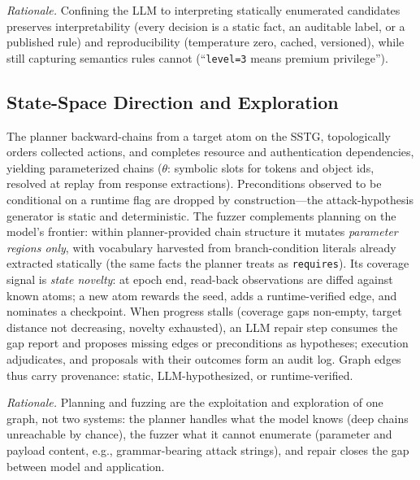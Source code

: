 \documentclass[letterpaper,twocolumn,10pt]{article}
\begin{document}
\emph{Rationale.} Confining the LLM to interpreting statically enumerated candidates preserves interpretability (every decision is a static fact, an auditable label, or a published rule) and reproducibility (temperature zero, cached, versioned), while still capturing semantics rules cannot (``\texttt{level=3} means premium privilege'').

\subsection{State-Space Direction and Exploration}
\label{sec:navigate}
The planner backward-chains from a target atom on the SSTG, topologically orders collected actions, and completes resource and authentication dependencies, yielding parameterized chains ($\theta$: symbolic slots for tokens and object ids, resolved at replay from response extractions). Preconditions observed to be conditional on a runtime flag are dropped by construction---the attack-hypothesis generator is static and deterministic. The fuzzer complements planning on the model's frontier: within planner-provided chain structure it mutates \emph{parameter regions only}, with vocabulary harvested from branch-condition literals already extracted statically (the same facts the planner treats as \texttt{requires}). Its coverage signal is \emph{state novelty}: at epoch end, read-back observations are diffed against known atoms; a new atom rewards the seed, adds a runtime-verified edge, and nominates a checkpoint. When progress stalls (coverage gaps non-empty, target distance not decreasing, novelty exhausted), an LLM repair step consumes the gap report and proposes missing edges or preconditions as hypotheses; execution adjudicates, and proposals with their outcomes form an audit log. Graph edges thus carry provenance: static, LLM-hypothesized, or runtime-verified.

\emph{Rationale.} Planning and fuzzing are the exploitation and exploration of one graph, not two systems: the planner handles what the model knows (deep chains unreachable by chance), the fuzzer what it cannot enumerate (parameter and payload content, e.g., grammar-bearing attack strings), and repair closes the gap between model and application.
\end{document}
